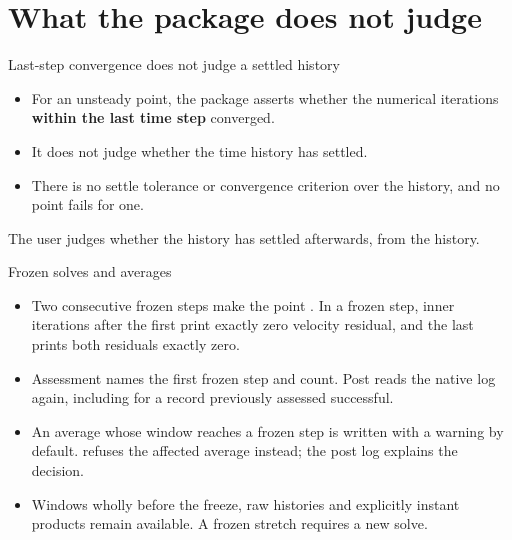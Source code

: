 %
\section{What the package does not judge}

\begin{frame}{Last-step convergence does not judge a settled history}
\begin{itemize}
  \item For an unsteady point, the package asserts whether the numerical
        iterations \textbf{within the last time step} converged.
  \item It does not judge whether the time history has settled.
  \item There is no settle tolerance or convergence criterion over the history,
        and no point fails for one.
\end{itemize}
\begin{takeaway}
The user judges whether the history has settled afterwards, from the history.
\end{takeaway}
\end{frame}

\begin{frame}{Frozen solves and averages}
\begin{itemize}\small
  \item Two consecutive frozen steps make the point .
        In a frozen step, inner iterations after the first print exactly zero
        velocity residual, and the last prints both residuals exactly zero.
  \item Assessment names the first frozen step and count. Post reads the native
        log again, including for a record previously assessed successful.
  \item An average whose window reaches a frozen step is written with a warning
        by default.  refuses the affected average instead;
        the post log explains the decision.
  \item Windows wholly before the freeze, raw histories and explicitly instant
        products remain available. A frozen stretch requires a new solve.
\end{itemize}
\end{frame}

